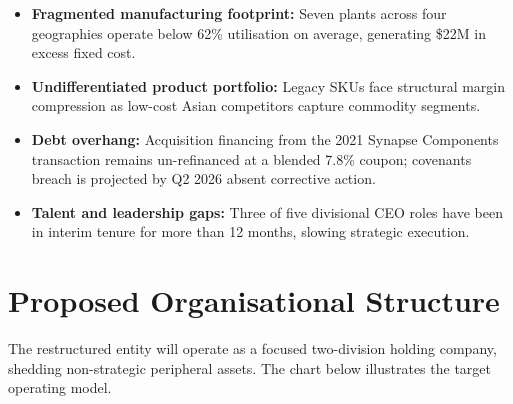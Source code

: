 \documentclass[11pt,a4paper]{article}
\begin{document}
\begin{tcolorbox}[goldbox]
\small
\begin{itemize}[leftmargin=1.2em,itemsep=3pt,topsep=2pt]
  \item[\lbrack 1\rbrack] \textbf{Fragmented manufacturing footprint:} Seven plants across four
    geographies operate below 62\% utilisation on average, generating \$22M in excess fixed cost.
  \item[\lbrack 2\rbrack] \textbf{Undifferentiated product portfolio:} Legacy SKUs face structural
    margin compression as low-cost Asian competitors capture commodity segments.
  \item[\lbrack 3\rbrack] \textbf{Debt overhang:} Acquisition financing from the 2021 Synapse
    Components transaction remains un-refinanced at a blended 7.8\% coupon; covenants breach
    is projected by Q2 2026 absent corrective action.
  \item[\lbrack 4\rbrack] \textbf{Talent and leadership gaps:} Three of five divisional CEO roles
    have been in interim tenure for more than 12 months, slowing strategic execution.
\end{itemize}
\end{tcolorbox}

\newpage

\section{Proposed Organisational Structure}

The restructured entity will operate as a focused two-division holding company, shedding
non-strategic peripheral assets. The chart below illustrates the target operating model.

\vspace{10pt}
\end{document}
